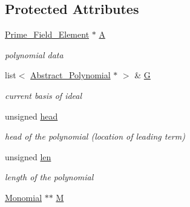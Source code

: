 \subsection*{Protected Attributes}
\begin{DoxyCompactItemize}
\item 
\mbox{\label{class_f4___reduction___data_a27719ab09e824f79349350d7eee2975f}} 
\hyperlink{class_prime___field___element}{Prime\+\_\+\+Field\+\_\+\+Element} $\ast$ \hyperlink{class_f4___reduction___data_a27719ab09e824f79349350d7eee2975f}{A}
\begin{DoxyCompactList}\small\item\em polynomial data \end{DoxyCompactList}\item 
\mbox{\label{class_f4___reduction___data_aeed96200cd3650d87f30f0bd6f03d8ac}} 
list$<$ \hyperlink{class_abstract___polynomial}{Abstract\+\_\+\+Polynomial} $\ast$ $>$ \& \hyperlink{class_f4___reduction___data_aeed96200cd3650d87f30f0bd6f03d8ac}{G}
\begin{DoxyCompactList}\small\item\em current basis of ideal \end{DoxyCompactList}\item 
\mbox{\label{class_f4___reduction___data_a37cbab663799bd722cb4b036857b810f}} 
unsigned \hyperlink{class_f4___reduction___data_a37cbab663799bd722cb4b036857b810f}{head}
\begin{DoxyCompactList}\small\item\em head of the polynomial (location of leading term) \end{DoxyCompactList}\item 
\mbox{\label{class_f4___reduction___data_a85be9b64d8107155b0004c16296d3822}} 
unsigned \hyperlink{class_f4___reduction___data_a85be9b64d8107155b0004c16296d3822}{len}
\begin{DoxyCompactList}\small\item\em length of the polynomial \end{DoxyCompactList}\item 
\mbox{\label{class_f4___reduction___data_a594a895cc396994d34664c52efc79050}} 
\hyperlink{class_monomial}{Monomial} $\ast$$\ast$ \hyperlink{class_f4___reduction___data_a594a895cc396994d34664c52efc79050}{M}
$$
\end{DoxyCompactItemize}
